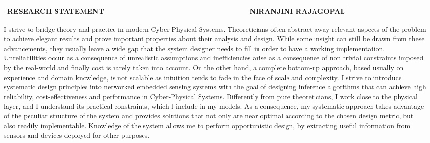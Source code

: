 \documentclass[10pt]{article}
\date{}
\begin{document}


\begin{table}
\color{blue}
\begin{tabular*}{\textwidth}{l r}
\large\textbf{RESEARCH STATEMENT} & 
\hfill \ \ \ \ \ \ \ \ \ \ \ \ \ \ \ \ \ \ \ \
\ \ \ \ \ \ \ \ \ \ \ \ \ \ \
\large\textbf{NIRANJINI RAJAGOPAL}\\
\hline
\end{tabular*}

\end{table}
 

I strive to bridge theory and practice in modern Cyber-Physical Systems. %
Theoreticians often abstract away relevant aspects of the problem to achieve elegant results and prove important properties about their analysis and design. While some insight can still be drawn from these advancements, they usually leave a wide gap that the system designer needs to fill in order to have a working implementation. Unreliabilities occur as a consequence of unrealistic assumptions and inefficiencies arise as a consequence of non trivial constraints imposed by the real-world and finally cost is rarely taken into account. On the other hand, a complete bottom-up approach, based usually on experience and domain knowledge, is not scalable as intuition tends to fade in the face of scale and complexity. I strive to introduce systematic design principles into networked embedded sensing systems with the goal of designing inference algorithms that can achieve high reliability, cost-effectiveness and performance in Cyber-Physical Systems. Differently from pure theoreticians, I work close to the physical layer, and I understand its practical constraints, which I include in my models. As a consequence, my systematic approach takes advantage of the peculiar structure of the system and provides solutions that not only are near optimal according to the chosen design metric, but also readily implementable. Knowledge of the system allows me to perform opportunistic design, by extracting useful information from sensors and devices deployed for other purposes. \\
\end{document}
